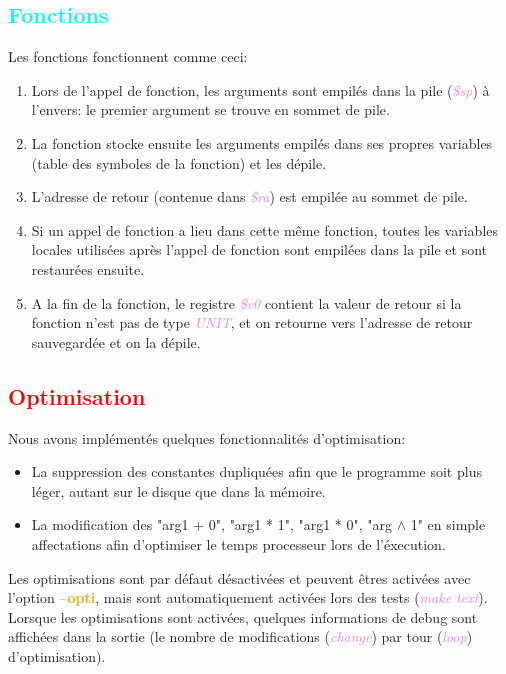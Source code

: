 \documentclass[a4paper]{article}
\let\oldtextbf\textbf
\renewcommand{\textbf}[1]{\textcolor{orange}{\oldtextbf{#1}}}
\let\oldtextit\textit
\renewcommand{\textit}[1]{\textcolor{violet}{\oldtextit{#1}}}
\newcommand{\csection}[1]{\textcolor{red}{\section{#1}}}
\newcommand{\csubsection}[1]{\textcolor{cyan}{\subsection{#1}}}
\begin{document}
\csubsection{Fonctions}

Les fonctions fonctionnent comme ceci:
\begin{enumerate}
    \item Lors de l'appel de fonction, les arguments sont empilés dans la pile (\textit{\$sp}) à l'envers: le premier argument se trouve en sommet de pile.
    \item La fonction stocke ensuite les arguments empilés dans ses propres variables (table des symboles de la fonction) et les dépile.
    \item L'adresse de retour (contenue dans \textit{\$ra}) est empilée au sommet de pile.
    \item Si un appel de fonction a lieu dans cette même fonction, toutes les variables locales utilisées après l'appel de fonction sont empilées dans la pile et sont restaurées ensuite.
    \item A la fin de la fonction, le registre \textit{\$v0} contient la valeur de retour si la fonction n'est pas de type \textit{UNIT}, et on retourne vers l'adresse de retour sauvegardée et on la dépile.
\end{enumerate}

\csection{Optimisation}

Nous avons implémentés quelques fonctionnalités d'optimisation:
\begin{itemize}
    \item La suppression des constantes dupliquées afin que le programme soit plus léger, autant sur le disque que dans la mémoire.
    \item La modification des "arg1 + 0", "arg1 * 1", "arg1 * 0", "arg $\wedge$ 1" en simple affectations afin d'optimiser le temps processeur lors de l'éxecution.
\end{itemize}

Les optimisations sont par défaut désactivées et peuvent êtres activées avec l'option \textbf{--opti}, mais sont automatiquement activées lors des tests (\textit{make text}).
Lorsque les optimisations sont activées, quelques informations de debug sont affichées dans la sortie (le nombre de modifications (\textit{change}) par tour (\textit{loop}) d'optimisation).
\end{document}
